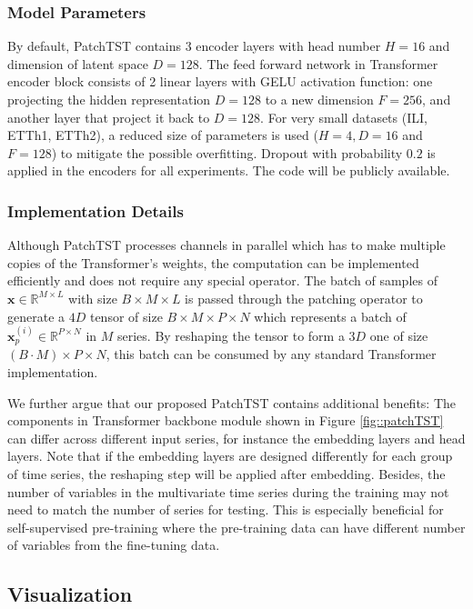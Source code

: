\documentclass{article} \usepackage{iclr2023_conference,times}
\def\vx{{\bm{x}}}
\newcommand{\R}{\mathbb{R}}
\begin{document}
\subsubsection{Model Parameters}

By default, PatchTST contains $3$ encoder layers with head number $H=16$ and dimension of latent space $D=128$. The feed forward network in Transformer encoder block consists of 2 linear layers with GELU \citep{gelu} activation function: one projecting the hidden representation $D=128$ to a new dimension $F=256$, and another layer that project it back to $D=128$. For very small datasets (ILI, ETTh1, ETTh2), a reduced size of parameters is used ($H=4, D=16$ and $F=128$) to mitigate the possible overfitting. Dropout with probability $0.2$ is applied in the encoders for all experiments. The code will be publicly available.

\subsubsection{Implementation Details}
\label{sec::implementation details}

Although PatchTST processes channels in parallel which has to make multiple copies of the Transformer's weights, the computation can be implemented efficiently and does not require any special operator. The batch of samples of $\vx \in \R^{M \times L}$ with size $B \times M \times L$ is passed through the patching operator to generate a $4D$ tensor of size $B \times M \times P \times N$ which represents a batch of $\vx^{(i)}_p \in \R^{P \times N}$ in $M$ series. By reshaping the tensor to form a $3D$ one of size $(B \cdot M) \times P \times N$, this batch can be consumed by any standard Transformer implementation. 

We further argue that our proposed PatchTST contains additional benefits: The components in Transformer backbone module shown in Figure \ref{fig::patchTST} can differ across different input series, for instance the embedding layers and head layers. Note that if the embedding layers are designed differently for each group of time series, the reshaping step will be applied after embedding. Besides, the number of variables in the multivariate time series during the training may not need to match the number of series for testing. This is especially beneficial for self-supervised pre-training where the pre-training data can have different number of variables from the fine-tuning data. 

\subsection{Visualization}
\end{document}
